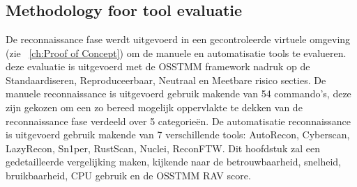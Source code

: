 
\chapter{}
\label{ch:geautomatiseerde Reconnaissance}

\section{Methodology foor tool evaluatie}

De reconnaissance fase werdt uitgevoerd in een gecontroleerde virtuele omgeving (zie ~\ref{ch:Proof of Concept}) om de manuele en automatisatie tools te evalueren.
deze evaluatie is uitgevoerd met de OSSTMM framework nadruk op de Standaardiseren, Reproduceerbaar, Neutraal en Meetbare risico secties.
De manuele reconnaissance is uitgevoerd gebruik makende van 54 commando's, deze zijn gekozen om een zo bereed mogelijk oppervlakte te dekken van de reconnaissance fase verdeeld over 5 categorieën.
De automatisatie reconnaissance is uitgevoerd gebruik makende van 7 verschillende tools: AutoRecon, Cyberscan, LazyRecon, Sn1per, RustScan, Nuclei, ReconFTW.
Dit hoofdstuk zal een gedetailleerde vergelijking maken, kijkende naar de betrouwbaarheid, snelheid, bruikbaarheid, CPU gebruik en de OSSTMM RAV score.


